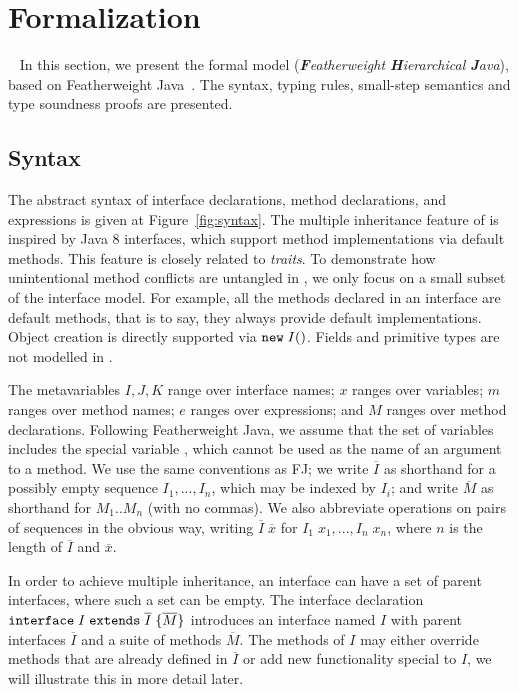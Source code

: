\section{Formalization}~\label{sec:formalization}
In this section, we present the formal model \MIM{} (\emph{\textbf{F}eatherweight \textbf{H}ierarchical \textbf{J}ava}), based on
Featherweight Java~\cite{Igarashi01FJ}. The syntax, typing rules,
small-step semantics and type soundness proofs are presented.

\vspace{-2ex}
\subsection{Syntax}
The abstract syntax of \MIM{} interface declarations, method declarations, and expressions is given at Figure~\ref{fig:syntax}. The multiple
inheritance feature of \MIM{} is inspired by Java 8 interfaces, which support
method implementations via default methods. This feature is 
closely related to \emph{traits}. To demonstrate how
unintentional method conflicts are untangled in \MIM{}, we only focus on a small subset of the interface model. For example, all the methods declared
in an interface are default methods, that is to say, they always
provide default implementations. 
Object creation is directly supported via $\texttt{new} \; I()$. 
Fields and primitive types are not modelled in \MIM{}.

The metavariables $I, J, K$ range over interface names; $x$ ranges over variables; $m$ ranges over method names; $e$ ranges over expressions; and $M$ ranges over method declarations. Following Featherweight Java, we assume that the set of variables includes the special variable \kwthis, which cannot be used as the name of an argument to a method. We use the same
conventions as FJ; we write $\overline{I}$ as shorthand for a possibly empty sequence $I_1, ..., I_n$, which may be indexed by $I_i$; and write $\overline{M}$ as shorthand for $M_1 .. M_n$ (with no commas). We also abbreviate operations on pairs of sequences in the obvious way, writing $\overline{I} \; \overline{x}$ for $I_1 \; x_1, ..., I_n \; x_n$, where $n$ is the length of $\overline{I}$ and $\overline{x}$.

In order to achieve multiple inheritance, an interface can have a set of 
parent interfaces, where such a set can be empty. The interface declaration $\texttt{interface} \; I \; \texttt{extends} \; \overline{I} \; {\{} \overline{M} {\}}$ introduces an interface named $I$ with parent interfaces $\overline{I}$ and a suite of methods $\overline{M}$. The methods of $I$ may either override methods that are already defined in $\overline{I}$ or add new functionality special to $I$, we will illustrate this in more detail later.

